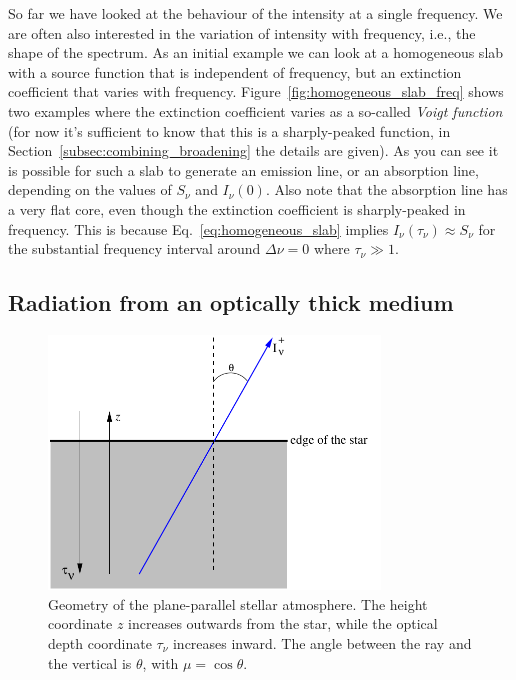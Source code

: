 \documentclass[12pt]{article}
\numberwithin{equation}{section}
\def\Inu{\ensuremath{I_{\nu}}}
\def\Snu{\ensuremath{S_{\nu}}}
\def\taunu{\ensuremath{\tau_{\nu}}}
\begin{document}
So far we have looked at the behaviour of the intensity at a single frequency. We are often also interested in the variation of intensity with frequency, i.e., the shape of the spectrum. As an initial example we can look at a homogeneous slab with a source function that is independent  of frequency, but an extinction coefficient that varies with frequency. Figure~\ref{fig:homogeneous_slab_freq} shows two examples where the extinction coefficient varies as a so-called {\em Voigt function} (for now it's sufficient to know that this is a sharply-peaked function, in Section~\ref{subsec:combining_broadening} the details are given). As you can see it is possible for such a slab to generate an emission line, or an absorption line, depending on the values of $\Snu$ and $\Inu(0)$. Also note that the absorption line has a very flat core, even though the extinction coefficient is sharply-peaked in frequency. This is because Eq.~\ref{eq:homogeneous_slab} implies $\Inu(\taunu)  \approx  \Snu$ for the substantial frequency interval around $\Delta \nu = 0$ where $\taunu \gg 1$.
\subsection{Radiation from an optically thick medium}

\begin{figure}
  \centering
  \includegraphics[width=8.8cm]{figs/plane_parallel}
  \caption{Geometry of the plane-parallel stellar atmosphere. The height coordinate $z$ increases outwards from the star, while the optical depth coordinate $\taunu$ increases inward. The angle between the ray and the vertical is $\theta$, with $\mu = \cos{\theta}$.}
\end{figure}
\end{document}
